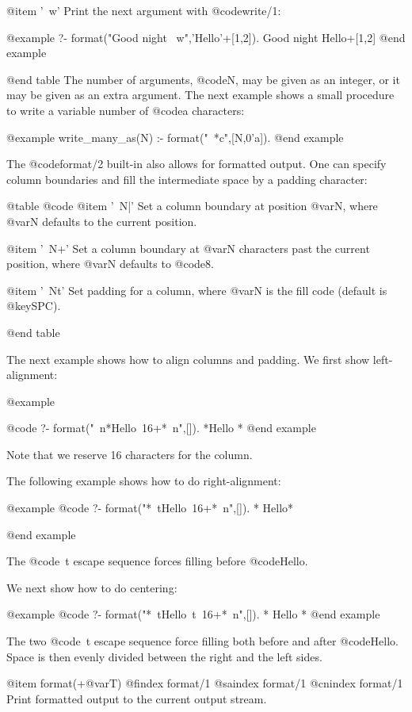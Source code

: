 {{{{{{@item '~w'
Print the next argument with @code{write/1}:

@example
?- format("Good night ~w",'Hello'+[1,2]).
Good night Hello+[1,2]
@end example

@end table
The number of arguments, @code{N}, may be given as an integer, or it
may be given as an extra argument. The next example shows a small
procedure to write a variable number of @code{a} characters:

@example
write_many_as(N) :-
        format("~*c",[N,0'a]).
@end example

The @code{format/2} built-in also allows for formatted output.  One can
specify column boundaries and fill the intermediate space by a padding
character: 

@table @code
@item '~N|'
Set a column boundary at position @var{N}, where @var{N} defaults to the
current position.

@item '~N+'
Set a column boundary at @var{N} characters past the current position, where
@var{N} defaults to @code{8}.


@item '~Nt'
Set padding for a column, where @var{N} is the fill code (default is
@key{SPC}).

@end table

The next example shows how to align columns and padding. We first show
left-alignment:

@example

@code{
   ?- format("~n*Hello~16+*~n",[]).
*Hello          *
}
@end example

Note that we reserve 16 characters for the column.

The following example shows how to do right-alignment:


@example
@code{
   ?- format("*~tHello~16+*~n",[]).
*          Hello*
}

@end example


The @code{~t} escape sequence forces filling before @code{Hello}. 

We next show how to do centering:

@example
@code{
   ?- format("*~tHello~t~16+*~n",[]).
*     Hello     *
}
@end example


The two @code{~t} escape sequence force filling both before and after
@code{Hello}. Space is then evenly divided between the right and the
left sides.


@item format(+@var{T})
@findex format/1
@saindex format/1
@cnindex format/1
Print formatted output to the current output stream.


}}}}}}

